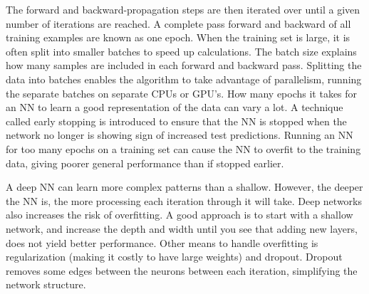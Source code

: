         The forward and backward-propagation steps are then iterated over until a given number of iterations are reached. A complete pass forward and backward of all training examples are known as one epoch. When the training set is large, it is often split into smaller batches to speed up calculations. The batch size explains how many samples are included in each forward and backward pass. Splitting the data into batches enables the algorithm to take advantage of parallelism, running the separate batches on separate CPUs or GPU's. How many epochs it takes for an NN to learn a good representation of the data can vary a lot. A technique called early stopping is introduced to ensure that the NN is stopped when the network no longer is showing sign of increased test predictions. Running an NN for too many epochs on a training set can cause the NN to overfit to the training data, giving poorer general performance than if stopped earlier.  
        
        
        A deep NN can learn more complex patterns than a shallow. However, the deeper the NN is, the more processing each iteration through it will take. Deep networks also increases the risk of overfitting. A good approach is to start with a shallow network, and increase the depth and width until you see that adding new layers, does not yield better performance. Other means to handle overfitting is regularization (making it costly to have large weights) and dropout. Dropout removes some edges between the neurons between each iteration, simplifying the network structure. 
    
